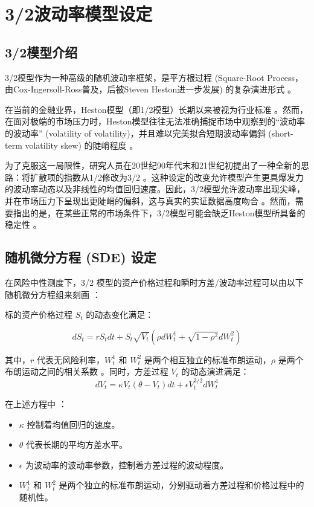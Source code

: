 \chapter{3/2波动率模型设定}
\label{chap:model}

\section{3/2模型介绍}
\label{sec:model_setup}

3/2模型作为一种高级的随机波动率框架，是平方根过程 (Square-Root Process，由Cox-Ingersoll-Ross普及，后被Steven Heston进一步发展) 的复杂演进形式 。

在当前的金融业界，Heston模型（即1/2模型）长期以来被视为行业标准 。然而，在面对极端的市场压力时，Heston模型往往无法准确捕捉市场中观察到的“波动率的波动率” (volatility of volatility)，并且难以完美拟合短期波动率偏斜 (short-term volatility skew) 的陡峭程度 。

为了克服这一局限性，研究人员在20世纪90年代末和21世纪初提出了一种全新的思路：将扩散项的指数从1/2修改为3/2 。这种设定的改变允许模型产生更具爆发力的波动率动态以及非线性的均值回归速度。因此，3/2模型允许波动率出现尖峰，并在市场压力下呈现出更陡峭的偏斜，这与真实的实证数据高度吻合 。然而，需要指出的是，在某些正常的市场条件下，3/2模型可能会缺乏Heston模型所具备的稳定性 。

\section{随机微分方程 (SDE) 设定}

在风险中性测度下，3/2 模型的资产价格过程和瞬时方差/波动率过程可以由以下随机微分方程组来刻画 ：

标的资产价格过程 $S_t$ 的动态变化满足：

\begin{equation}
    dS_t = r S_t dt + S_t \sqrt{V_t} (\rho dW_t^1 + \sqrt{1-\rho^2} dW_t^2)
    \label{eq:underlyingProcess}
\end{equation}

其中，$r$ 代表无风险利率，$W_t^1$ 和 $W_t^2$ 是两个相互独立的标准布朗运动，$\rho$ 是两个布朗运动之间的相关系数 。同时，方差过程 $V_t$ 的动态演进满足：
\begin{equation}
    dV_t = \kappa V_t (\theta - V_t) dt + \epsilon V_t^{3/2} dW_t^1
    \label{eq:varianceProcess}
\end{equation}

在上述方程中 ：

\begin{itemize}
    \item $\kappa$ 控制着均值回归的速度。
    \item $\theta$ 代表长期的平均方差水平。
    \item $\epsilon$ 为波动率的波动率参数，控制着方差过程的波动程度。
    \item $W_t^1$ 和 $W_t^2$ 是两个独立的标准布朗运动，分别驱动着方差过程和价格过程中的随机性。
\end{itemize}

